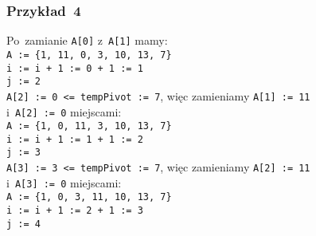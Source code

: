 \documentclass[10pt,t]{beamer}
\begin{document}
\begin{frame}
  \frametitle{Przykład~4}


  Po~zamianie \texttt{A[0]} z~\texttt{A[1]} mamy: \\
  \texttt{A := \{1, 11, 0, 3, 10, 13, 7\}} \\
  \texttt{i := i + 1 := 0 + 1 := 1} \\
  \texttt{j := 2} \\
  \texttt{A[2] := 0 <= tempPivot := 7}, więc zamieniamy
  \texttt{A[1] := 11} \\
  i~\texttt{A[2] := 0} miejscami: \\
  \texttt{A := \{1, 0, 11, 3, 10, 13, 7\}} \\
  \texttt{i := i + 1 := 1 + 1 := 2} \\
  \texttt{j := 3} \\
  \texttt{A[3] := 3 <= tempPivot := 7}, więc zamieniamy
  \texttt{A[2] := 11} \\
  i~\texttt{A[3] := 0} miejscami: \\
  \texttt{A := \{1, 0, 3, 11, 10, 13, 7\}} \\
  \texttt{i := i + 1 := 2 + 1 := 3} \\
  \texttt{j := 4}

\end{frame}
\end{document}
